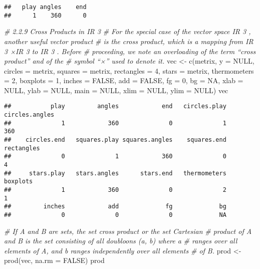 \documentclass[
]{article}
\newenvironment{Shaded}{\begin{snugshade}}{\end{snugshade}}
\newcommand{\AttributeTok}[1]{\textcolor[rgb]{0.77,0.63,0.00}{#1}}
\newcommand{\CommentTok}[1]{\textcolor[rgb]{0.56,0.35,0.01}{\textit{#1}}}
\newcommand{\ConstantTok}[1]{\textcolor[rgb]{0.00,0.00,0.00}{#1}}
\newcommand{\DecValTok}[1]{\textcolor[rgb]{0.00,0.00,0.81}{#1}}
\newcommand{\FunctionTok}[1]{\textcolor[rgb]{0.00,0.00,0.00}{#1}}
\newcommand{\NormalTok}[1]{#1}
\newcommand{\OtherTok}[1]{\textcolor[rgb]{0.56,0.35,0.01}{#1}}
\begin{document}
\begin{verbatim}
##   play angles    end 
##      1    360      0
\end{verbatim}

\begin{Shaded}
\begin{Highlighting}[]
\CommentTok{\# 2.2.9 Cross Products in IR 3}
\CommentTok{\# For the special case of the vector space IR 3 , another useful vector product }
\CommentTok{\# is the cross product, which is a mapping from IR 3 ×IR 3 to IR 3 . Before }
\CommentTok{\# proceeding, we note an overloading of the term “cross product” and of the }
\CommentTok{\# symbol “×” used to denote it.}
\NormalTok{vec }\OtherTok{\textless{}{-}} \FunctionTok{c}\NormalTok{(metrix, }\AttributeTok{y =} \ConstantTok{NULL}\NormalTok{, }\AttributeTok{circles =}\NormalTok{ metrix, }\AttributeTok{squares =}\NormalTok{ metrix, }
        \AttributeTok{rectangles =} \DecValTok{4}\NormalTok{, }\AttributeTok{stars =}\NormalTok{ metrix, }\AttributeTok{thermometers =} \DecValTok{2}\NormalTok{, }
        \AttributeTok{boxplots =} \DecValTok{1}\NormalTok{, }\AttributeTok{inches =} \ConstantTok{FALSE}\NormalTok{, }\AttributeTok{add =} \ConstantTok{FALSE}\NormalTok{, }\AttributeTok{fg =} \DecValTok{0}\NormalTok{, }\AttributeTok{bg =} \ConstantTok{NA}\NormalTok{,}
        \AttributeTok{xlab =} \ConstantTok{NULL}\NormalTok{, }\AttributeTok{ylab =} \ConstantTok{NULL}\NormalTok{, }\AttributeTok{main =} \ConstantTok{NULL}\NormalTok{, }\AttributeTok{xlim =} \ConstantTok{NULL}\NormalTok{, }\AttributeTok{ylim =} \ConstantTok{NULL}\NormalTok{)}
\NormalTok{vec}
\end{Highlighting}
\end{Shaded}

\begin{verbatim}
##           play         angles            end   circles.play circles.angles 
##              1            360              0              1            360 
##    circles.end   squares.play squares.angles    squares.end     rectangles 
##              0              1            360              0              4 
##     stars.play   stars.angles      stars.end   thermometers       boxplots 
##              1            360              0              2              1 
##         inches            add             fg             bg 
##              0              0              0             NA
\end{verbatim}

\begin{Shaded}
\begin{Highlighting}[]
\CommentTok{\# If A and B are sets, the set cross product or the set Cartesian}
\CommentTok{\# product of A and B is the set consisting of all doubloons (a, b) where a }
\CommentTok{\# ranges over all elements of A, and b ranges independently over all elements }
\CommentTok{\# of B.}
\NormalTok{prod }\OtherTok{\textless{}{-}} \FunctionTok{prod}\NormalTok{(vec, }\AttributeTok{na.rm =} \ConstantTok{FALSE}\NormalTok{)}
\NormalTok{prod }
\end{Highlighting}
\end{Shaded}
\end{document}

